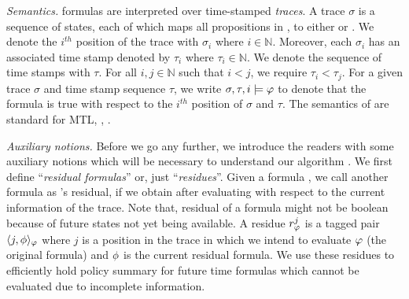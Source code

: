 \textit{Semantics. }
\planguage formulas are interpreted over time-stamped \emph{traces}. A trace $\sigma$ is a sequence of states, each of which maps all propositions in \sfmap, to either \true or \false. We denote the $i^{th}$ position of the trace with $\sigma_i$ where $i\in\mathbb{N}$. Moreover, each $\sigma_i$ has an associated time stamp denoted by $\tau_i$ where $\tau_i\in\mathbb{N}$. 
We denote the sequence of time stamps with $\tau$. For all $i, j\in\mathbb{N}$ such that $i < j$, we require $\tau_i < \tau_j$. For a given trace $\sigma$ and time stamp sequence $\tau$, we write $\sigma, \tau, i\models\varphi$ to denote that the formula \policy is true with respect to the $i^{th}$ position of $\sigma$ and $\tau$. 
The semantics of \planguage are standard for MTL, \eg, \cite{Basin2008}.

\textit{Auxiliary notions.} 
Before we go any further, we introduce the readers with some auxiliary notions which will be 
necessary to understand our algorithm \monitor. We first define ``\emph{residual formulas}'' or, just ``\emph{residues}''. 
Given a formula \policy, we call another formula \policyv as \policy's residual, if we obtain \policyv after  evaluating 
\policy with respect to the current information of the trace. Note that, residual of a formula might not be boolean because of future states 
not yet being available. A residue $r^j_{\varphi}$ is a tagged pair $\langle j, \phi \rangle_{\varphi}$ where $j$ is a position in the trace in which we intend to evaluate $\varphi$ (the original formula) and $
\phi$ is the current residual formula. We use these residues to efficiently hold policy summary for future time formulas which cannot be evaluated due to incomplete information.

